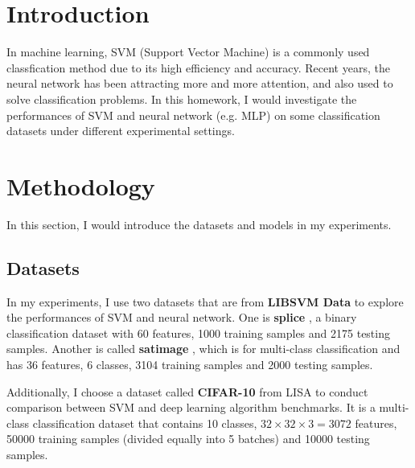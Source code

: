 \documentclass[12pt,a4paper]{article}
\theoremstyle{definition}
\begin{document}
\noindent
\noindent{}

\section{Introduction}

In machine learning, SVM (Support Vector Machine) is a commonly used classfication method due to its high efficiency and accuracy. Recent years, the neural network has been attracting more and more attention, and also used to solve classification problems. In this homework, I would investigate the performances of SVM and neural network (e.g. MLP) on some classification datasets under different experimental settings.

\section{Methodology}

In this section, I would introduce the datasets and models in my experiments.

\subsection{Datasets}

In my experiments, I use two datasets that are from \textbf{LIBSVM Data} \cite{dataA} to explore the performances of SVM and neural network. One is \textbf{splice} \cite{splice}, a binary classification dataset with 60 features, 1000 training samples and 2175 testing samples. Another is called \textbf{satimage} \cite{satimage}, which is for multi-class classification and has 36 features, 6 classes, 3104 training samples and 2000 testing samples.

\vspace{0.01\linewidth}
Additionally, I choose a dataset called \textbf{CIFAR-10} \cite{cifar-10} from LISA \cite{dataB} to conduct comparison between SVM and deep learning algorithm benchmarks. It is a multi-class classification dataset that contains 10 classes, $32 \times 32 \times 3 = 3072$ features, 50000 training samples (divided equally into 5 batches) and 10000 testing samples.
\end{document}
